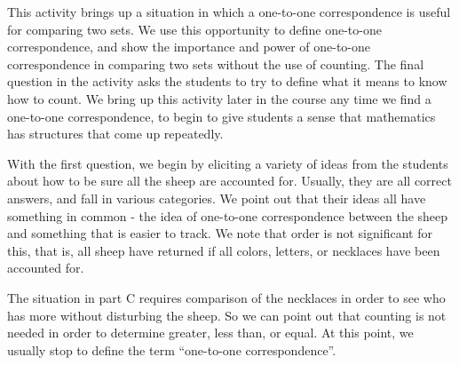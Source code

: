 \documentclass[nooutcomes]{ximera}
\begin{document}
\newpage
\begin{instructorNotes}

This activity brings up a situation in which a one-to-one correspondence is useful for comparing two sets.  We use this opportunity to define one-to-one correspondence, and show the importance and power of one-to-one correspondence in comparing two sets without the use of counting.  
The final question in the activity asks the students to try to define what it means to know how to count. We bring up this activity later in the course any time we find a one-to-one correspondence, to begin to give students a sense that mathematics has structures that come up repeatedly.


With the first question, we begin by eliciting a variety of ideas from the students about how to be sure all the sheep are accounted for.  Usually, they are all correct answers, and fall in various categories.  We point out that their ideas all have something in common - the idea of one-to-one correspondence between the sheep and something that is easier to track.  We note that order is not significant for this, that is, all sheep have returned if all colors, letters, or necklaces have been accounted for.


The situation in part C requires comparison of the necklaces in order to see who has more without disturbing the sheep.  So we can point out that counting is not needed in order to determine greater, less than, or equal. At this point, we usually stop to define the term ``one-to-one correspondence''.




\end{instructorNotes}
\end{document}
